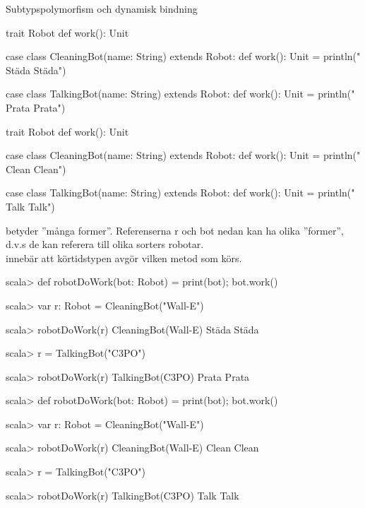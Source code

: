 \begin{Slide}{Subtypspolymorfism och dynamisk bindning}\SlideFontTiny
\ifswedish
\begin{Code}[basicstyle=\SlideFontSize{6.2}{7.5}\ttfamily\selectfont]
trait Robot { def work(): Unit }

case class CleaningBot(name: String) extends Robot:
  def work(): Unit = println(" Städa Städa")

case class TalkingBot(name: String) extends Robot:
  def work(): Unit = println(" Prata Prata")
\end{Code}
\else
\begin{Code}[basicstyle=\SlideFontSize{6.2}{7.5}\ttfamily\selectfont]
trait Robot { def work(): Unit }

case class CleaningBot(name: String) extends Robot:
  def work(): Unit = println(" Clean Clean")

case class TalkingBot(name: String) extends Robot:
  def work(): Unit = println(" Talk Talk")
\end{Code}
\fi{}
 betyder ''många former''. Referenserna r och bot nedan kan ha olika ''former'', d.v.s de kan referera till olika sorters robotar. \\  innebär att körtidstypen avgör vilken metod som körs.
\ifswedish
\begin{REPL}[numbers=left, basicstyle=\color{white}\SlideFontSize{6.2}{7.5}\ttfamily\selectfont]
scala> def robotDoWork(bot: Robot) = { print(bot); bot.work() }

scala> var r: Robot = CleaningBot("Wall-E")

scala> robotDoWork(r)
CleaningBot(Wall-E) Städa Städa

scala> r = TalkingBot("C3PO")

scala> robotDoWork(r)
TalkingBot(C3PO) Prata Prata
\end{REPL}
\else
\begin{REPL}[numbers=left, basicstyle=\color{white}\SlideFontSize{6.2}{7.5}\ttfamily\selectfont]
scala> def robotDoWork(bot: Robot) = { print(bot); bot.work() }

scala> var r: Robot = CleaningBot("Wall-E")

scala> robotDoWork(r)
CleaningBot(Wall-E) Clean Clean

scala> r = TalkingBot("C3PO")

scala> robotDoWork(r)
TalkingBot(C3PO) Talk Talk
\end{REPL}
\fi{}
\end{Slide}
  
